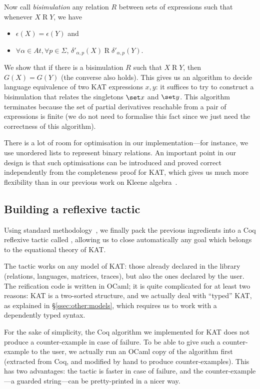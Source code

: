 \documentclass[a4paper]{llncs}
\begin{document}
Now call \emph{bisimulation} any relation $R$ between sets of
expressions such that whenever $X\mathrel R Y$, we have
\begin{itemize}
\item $\epsilon(X) = \epsilon(Y)$ and
\item $\forall\alpha\in At, \forall p\in\Sigma$,
  $\delta'_{\alpha,p}(X)\mathrel R\delta'_{\alpha,p}(Y)$.
\end{itemize}
We show that if there is a bisimulation $R$ such that $X\mathrel R
Y$, then $G(X)=G(Y)$ (the converse also holds).  This gives us an
algorithm to decide language equivalence of two KAT expressions $x,y$:
it suffices to try to construct a bisimulation that relates the
singletons $\set x$ and $\set y$. This algorithm terminates because the set of partial derivatives
reachable from a pair of expressions is finite (we do not need to
formalise this fact since we just need the correctness of this
algorithm).


There is a lot of room for optimisation in our implementation---for
instance, we use unordered lists to represent binary relations. An
important point in our design is that such optimisations can be
introduced and proved correct independently from the completeness
proof for KAT, which gives us much more flexibility than in our
previous work on Kleene algebra~\cite{bp:itp10:kacoq}.

\subsection{Building a reflexive tactic}
\label{ssec:kat:tac}

Using standard
methodology~\cite{BoyerMoore81,AllenCHA90,GregoireM05}, we finally pack the previous ingredients into a Coq reflexive tactic
called , allowing us to close automatically any goal which
belongs to the equational theory of KAT.

The tactic works on any model of KAT: those already declared in the
library (relations, languages, matrices, traces), but also the ones
declared by the user. 
The reification code is written in OCaml; it is quite complicated for
at least two reasons: KAT is a two-sorted structure, and we actually
deal with ``typed'' KAT, as explained in §\ref{ssec:other:models},
which requires us to work with a dependently typed syntax.

For the sake of simplicity, the Coq algorithm we implemented for KAT
does not produce a counter-example in case of failure. To be able to
give such a counter-example to the user, we actually run an OCaml
copy of the algorithm first (extracted from Coq, and modified by hand
to produce counter-examples). This has two advantages: the tactic is
faster in case of failure, and the counter-example---a guarded
string---can be pretty-printed in a nicer way.
\end{document}
